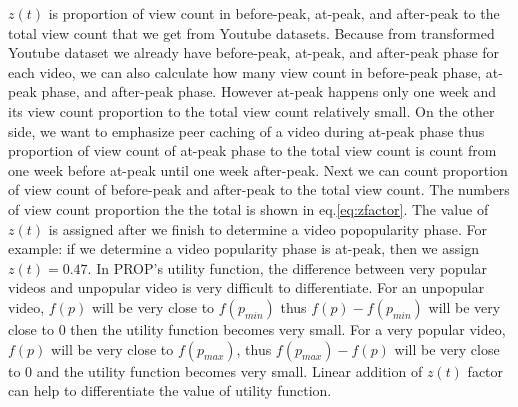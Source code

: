 \documentclass[10pt,final,journal,a4paper]{IEEEtran}
\begin{document}
$z(t)$ is proportion of view count in before-peak, at-peak, and after-peak to the total view count that we get from Youtube datasets.  
Because from transformed Youtube dataset we already have before-peak, at-peak, and after-peak phase for each video, we can also calculate how many view count in before-peak phase, at-peak phase, and after-peak phase.  
However at-peak happens only one week and its view count proportion to the total view count relatively small.
On the other side, we want to emphasize peer caching of a video during at-peak phase thus proportion of view count of at-peak phase to the total view count is count from one week before at-peak until one week after-peak.
Next we can count proportion of view count of before-peak and after-peak to the total view count.
The numbers of view count proportion the the total is shown in eq.\ref{eq:zfactor}.
The value of $z(t)$ is assigned after we finish to determine a video popopularity phase.  
For example: if we determine a video popularity phase is at-peak, then we assign $z(t)=0.47$.
In PROP's utility function, the difference between very popular videos and unpopular video is very difficult to differentiate. 
For an unpopular video, $f(p)$ will be very close to $f(p_{min})$ thus $f(p) - f(p_{min})$ will be very close to $0$ then the utility function becomes very small.
For a very popular video, $f(p)$ will be very close to $f(p_{max})$, thus $f(p_{max}) - f(p)$ will be very close to $0$ and the  utility function becomes very small.  
Linear addition of $z(t)$ factor can help to differentiate the value of utility function.
\end{document}
